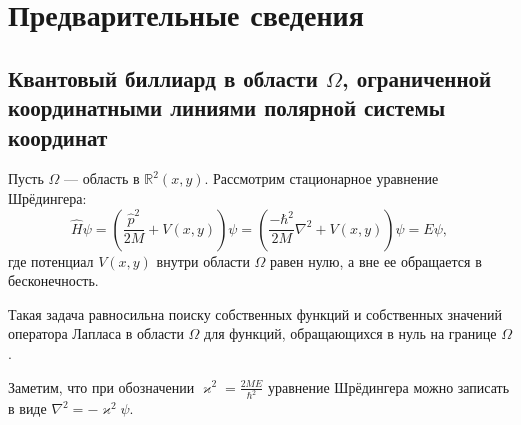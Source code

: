 \chapter{Предварительные сведения}\label{ch:ch1}
\section{Квантовый биллиард в области $\Omega$, ограниченной координатными линиями полярной системы координат}\label{sec:ch1/sec1}

Пусть $\Omega$ --- область в $\mathbb{R}^2(x,y)$. Рассмотрим стационарное уравнение Шрёдингера:
\begin{equation*}
\hat{H}\psi = \left(\frac{\hat{p}^2}{2M} + V(x,y)\right) \psi = \left( \frac{-\hbar^2}{2M}\nabla^2 + V(x, y)\right) \psi = E\psi,
\label{eq:schrodinger}
\end{equation*}
где потенциал $V(x,y)$ внутри области $\Omega$ равен нулю, а вне ее обращается в бесконечность. 

\begin{remark}
Такая задача равносильна поиску собственных функций и собственных значений оператора Лапласа в области $\Omega$ для функций, обращающихся в нуль на границе $\Omega$. 
\label{rem:schrodinger_equivalent}
\end{remark}

Заметим, что при обозначении $\varkappa^2 = \frac{2 M E}{\hbar^2}$ уравнение Шрёдингера можно записать в виде $\nabla^2  = -\varkappa^2 \psi$.

